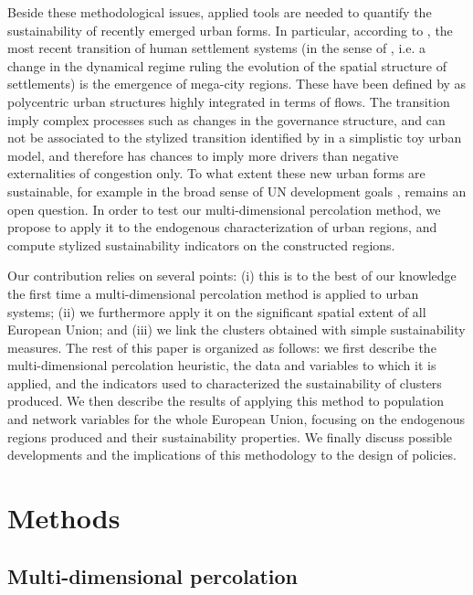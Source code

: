 \documentclass{article}
\begin{document}
Beside these methodological issues, applied tools are needed to quantify the sustainability of recently emerged urban forms. In particular, according to \cite{lenechet2017peupler}, the most recent transition of human settlement systems (in the sense of \cite{sanders2017peupler}, i.e. a change in the dynamical regime ruling the evolution of the spatial structure of settlements) is the emergence of mega-city regions. These have been defined by \cite{hall2006polycentric} as polycentric urban structures highly integrated in terms of flows. The transition imply complex processes such as changes in the governance structure, and can not be associated to the stylized transition identified by \cite{louf2013modeling} in a simplistic toy urban model, and therefore has chances to imply more drivers than negative externalities of congestion only. To what extent these new urban forms are sustainable, for example in the broad sense of UN development goals \citep{komiyama2006sustainability}, remains an open question. In order to test our multi-dimensional percolation method, we propose to apply it to the endogenous characterization of urban regions, and compute stylized sustainability indicators on the constructed regions.


Our contribution relies on several points: (i) this is to the best of our knowledge the first time a multi-dimensional percolation method is applied to urban systems; (ii) we furthermore apply it on the significant spatial extent of all European Union; and (iii) we link the clusters obtained with simple sustainability measures. The rest of this paper is organized as follows: we first describe the multi-dimensional percolation heuristic, the data and variables to which it is applied, and the indicators used to characterized the sustainability of clusters produced. We then describe the results of applying this method to population and network variables for the whole European Union, focusing on the endogenous regions produced and their sustainability properties. We finally discuss possible developments and the implications of this methodology to the design of policies.



\section{Methods}




\subsection{Multi-dimensional percolation}
\end{document}
